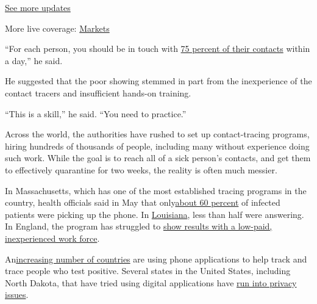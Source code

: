 \href{https://www.nytimes3xbfgragh.onion/2020/08/20/world/coronavirus-covid.html?action=click\&pgtype=Article\&state=default\&region=MAIN_CONTENT_1\&context=storylines_live_updates}{See
more updates}

More live coverage:
\href{https://www.nytimes3xbfgragh.onion/live/2020/08/20/business/stock-market-today-coronavirus?action=click\&pgtype=Article\&state=default\&region=MAIN_CONTENT_1\&context=storylines_live_updates}{Markets}

``For each person, you should be in touch with
\href{https://covidlocal.org/assets/documents/COVID\%20Local\%20Metrics\%20overview.pdf}{75
percent of their contacts} within a day,'' he said.

He suggested that the poor showing stemmed in part from the inexperience
of the contact tracers and insufficient hands-on training.

``This is a skill,'' he said. ``You need to practice.''

Across the world, the authorities have rushed to set up contact-tracing
programs, hiring hundreds of thousands of people, including many without
experience doing such work. While the goal is to reach all of a sick
person's contacts, and get them to effectively quarantine for two weeks,
the reality is often much messier.

In Massachusetts, which has one of the most established tracing programs
in the country, health officials said in May that
only\href{https://www.boston25news.com/news/health/more-than-60-percent-mass-contact-tracing-calls-answered/4NK2EEGVEVCDFBMICEKZXFCXR4/}{about
60 percent} of infected patients were picking up the phone. In
\href{https://www.governing.com/now/Louisiana-Struggles-to-Get-Contact-Tracer-Calls-Answered.html}{Louisiana},
less than half were answering. In England, the program has struggled to
\href{https://www.nytimes3xbfgragh.onion/2020/06/17/world/europe/uk-contact-tracing-coronavirus.html}{show
results with a low-paid, inexperienced work force}.

An\href{https://www.wsj.com/articles/coronavirus-contact-tracing-apps-launch-across-europe-amid-hopes-for-broad-adoption-11592319612}{increasing
number of countries} are using phone applications to help track and
trace people who test positive. Several states in the United States,
including North Dakota, that have tried using digital applications have
\href{https://www.washingtonpost.com/technology/2020/05/21/care19-dakota-privacy-coronavirus/}{run
into privacy issues}.

